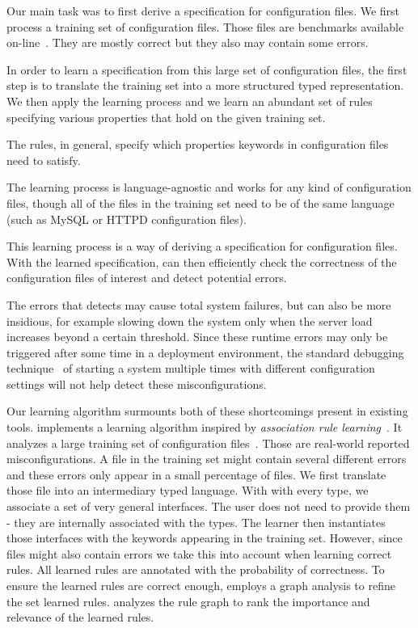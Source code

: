 Our main task was to first derive a specification for configuration 
files. We first process a training set of configuration files. Those files are benchmarks 
available on-line~. They are mostly correct
but they also may contain some errors.

In order to learn a specification from this large set of configuration
files,
the first step is to 
translate the training set into a more structured typed representation.
We then apply the learning process and we learn an abundant set of rules 
specifying various properties that hold on the given training set. 

The rules, in general, 
specify which properties keywords in configuration files need to satisfy.

The learning process is language-agnostic and works for any kind 
of configuration files, though all of the files in the training set need to be of 
the same language (such as MySQL or HTTPD configuration files).

This learning process is a way of deriving a specification for configuration files. 
With the learned specification, \app can then efficiently check 
the correctness of the configuration files of interest and detect 
potential errors. 

The errors that \app detects may cause total system failures, but can also be more insidious, for example slowing down the system only when the server load increases beyond a certain threshold.
Since these runtime errors may only be triggered after some time in a deployment environment, the standard debugging 
technique~\cite{Zeller:2005:WPF:1077048} of starting a system multiple times with different configuration settings will not help detect these misconfigurations.



Our learning algorithm surmounts both of these shortcomings present in 
existing tools.  \app implements a learning
algorithm inspired by {\em association rule
learning}~\cite{agrawal1993mining}. It analyzes a large training set of configuration files~\cite{configdataset}. Those are real-world reported misconfigurations. 
A file in the training set might contain several different errors and these errors only appear 
in a small percentage of files. 
We first translate those file into an intermediary typed language. 
With with every type, we associate a set of very general interfaces. 
The user does not need to provide them - they are internally associated with the types. 
The learner then instantiates those interfaces with the keywords appearing in 
the training set. However, since files might also contain errors we take 
this into account when learning correct rules. All learned rules are 
annotated with the probability of correctness.  
To ensure the learned rules are correct enough,
\app employs a graph analysis to refine the set learned rules.
\app analyzes the rule graph to rank the importance and relevance of the learned rules. 

